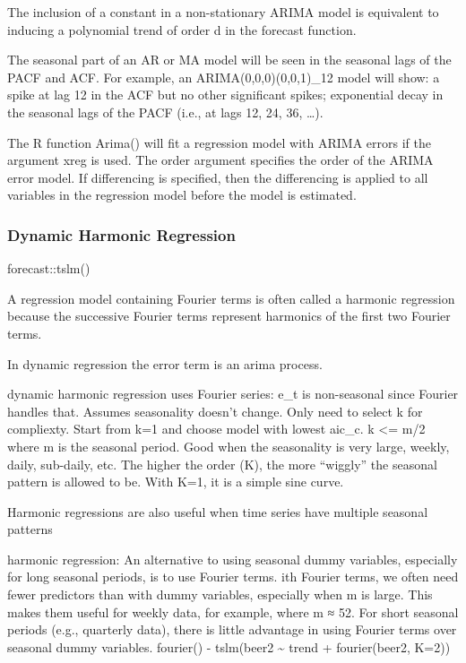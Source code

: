 \documentclass[]{book}
\begin{document}
The inclusion of a constant in a non-stationary ARIMA model is
equivalent to inducing a polynomial trend of order d in the forecast
function.

The seasonal part of an AR or MA model will be seen in the seasonal lags
of the PACF and ACF. For example, an ARIMA(0,0,0)(0,0,1)\_12 model will
show: a spike at lag 12 in the ACF but no other significant spikes;
exponential decay in the seasonal lags of the PACF (i.e., at lags 12,
24, 36, \ldots{}).

The R function Arima() will fit a regression model with ARIMA errors if
the argument xreg is used. The order argument specifies the order of the
ARIMA error model. If differencing is specified, then the differencing
is applied to all variables in the regression model before the model is
estimated.

\subsubsection{Dynamic Harmonic
Regression}\label{dynamic-harmonic-regression}

forecast::tslm()

A regression model containing Fourier terms is often called a harmonic
regression because the successive Fourier terms represent harmonics of
the first two Fourier terms.

In dynamic regression the error term is an arima process.

dynamic harmonic regression uses Fourier series: e\_t is non-seasonal
since Fourier handles that. Assumes seasonality doesn't change. Only
need to select k for compliexty. Start from k=1 and choose model with
lowest aic\_c. k \textless{}= m/2 where m is the seasonal period. Good
when the seasonality is very large, weekly, daily, sub-daily, etc. The
higher the order (K), the more ``wiggly'' the seasonal pattern is
allowed to be. With K=1, it is a simple sine curve.

Harmonic regressions are also useful when time series have multiple
seasonal patterns

harmonic regression: An alternative to using seasonal dummy variables,
especially for long seasonal periods, is to use Fourier terms. ith
Fourier terms, we often need fewer predictors than with dummy variables,
especially when m is large. This makes them useful for weekly data, for
example, where m ≈ 52. For short seasonal periods (e.g., quarterly
data), there is little advantage in using Fourier terms over seasonal
dummy variables. fourier() - tslm(beer2 \textasciitilde{} trend +
fourier(beer2, K=2))
\end{document}
